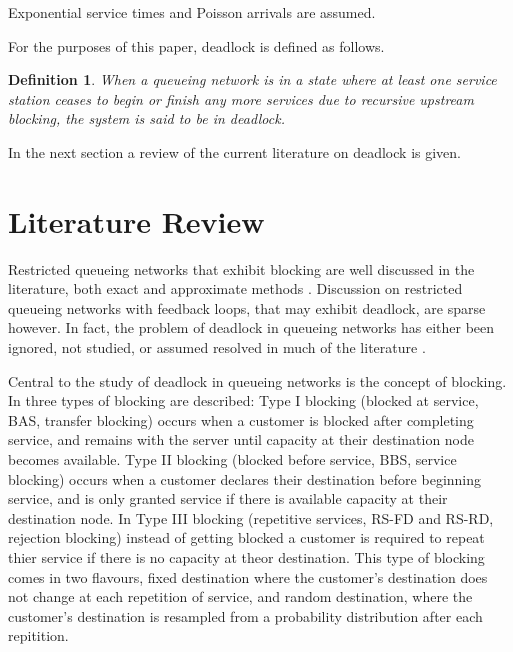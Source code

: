 \documentclass{article}
\newtheorem{definition}{Definition}
\numberwithin{equation}{section}
\begin{document}
Exponential service times and Poisson arrivals are assumed.

For the purposes of this paper, deadlock is defined as follows.\\

\begin{definition}
    When a queueing network is in a state where at least one service
    station ceases to begin or finish any more services due to
    recursive upstream blocking, the system is said to be in deadlock.
\end{definition}

In the next section a review of the current literature on deadlock is given.


\section{Literature Review}\label{sec:litreview}


Restricted queueing networks that exhibit blocking are well discussed in the literature, both exact \cite{hunt56, baber08, aviitzhakyadin65, koizumietal05, latoucheneuts80, perrosetal88} and approximate methods \cite{takahashi80, korporaaletal00, onvural90, perrosetal88}. Discussion on restricted queueing networks with feedback loops, that may exhibit deadlock, are sparse however.
In fact, the problem of deadlock in queueing networks has either been ignored, not studied, or assumed resolved in much of the literature \cite{onvural90, perrosetal88}.

Central to the study of deadlock in queueing networks is the concept of blocking.
In \cite{onvuralperros86} three types of blocking are described:
Type I blocking (blocked at service, BAS, transfer blocking) occurs when a customer is blocked after completing service, and remains with the server until capacity at their destination node becomes available.
Type II blocking (blocked before service, BBS, service blocking) occurs when a customer declares their destination before beginning service, and is only granted service if there is available capacity at their destination node.
In Type III blocking (repetitive services, RS-FD and RS-RD, rejection blocking) instead of getting blocked a customer is required to repeat thier service if there is no capacity at theor destination. This type of blocking comes in two flavours, fixed destination where the customer's destination does not change at each repetition of service, and random destination, where the customer's destination is resampled from a probability distribution after each repitition.
\end{document}
